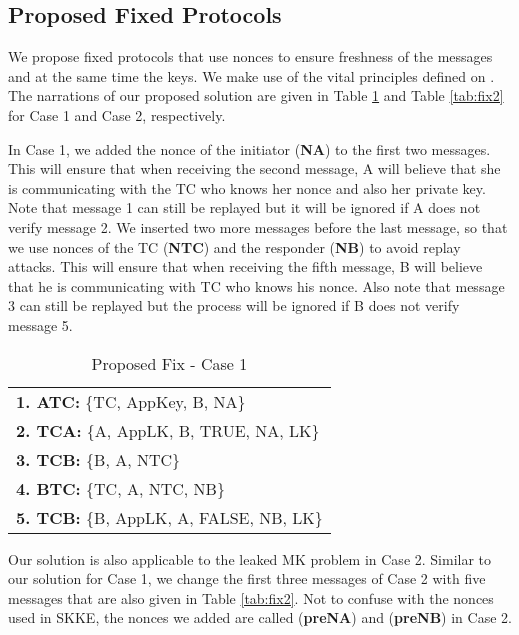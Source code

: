 \subsection{Proposed Fixed Protocols}
\label{fix}
We propose fixed protocols that use nonces to ensure freshness of the messages and at the same time the keys. 
We make use of the vital principles defined on \cite{Abadi:Needham}. 
The narrations of our proposed solution are given in Table \ref{tab:fix1} and Table \ref{tab:fix2} for Case 1 and Case 2, respectively.

In Case 1, we added the nonce of the initiator (\textbf{NA}) to the first two messages. 
This will ensure that when receiving the second message, A will believe that she is communicating with the TC who knows her nonce and also her private key. 
Note that message 1 can still be replayed but it will be ignored if A does not verify message 2. 
We inserted two more messages before the last message, so that we use nonces of the TC (\textbf{NTC}) and the responder (\textbf{NB}) to avoid replay attacks.
This will ensure that when receiving the fifth message, B will believe that he is communicating with TC who knows his nonce.
Also note that message 3 can still be replayed but the process will be ignored if B does not verify message 5. 

\begin{table}\caption{Proposed Fix - Case 1}
\label{tab:fix1}
\centering
\begin{tabular}{l}
\hline
\textbf{1. ATC:} \{TC, AppKey, B, NA\}   \\
\textbf{2. TCA:} \{A, AppLK, B, TRUE, NA, LK\}  \\
\textbf{3. TCB:} \{B, A, NTC\}  \\
\textbf{4. BTC:} \{TC, A, NTC, NB\}  \\
\textbf{5. TCB:} \{B, AppLK, A, FALSE, NB, LK\}  \\
\hline
\end{tabular}
\end{table}
Our solution is also applicable to the leaked MK problem in Case 2. 
Similar to our solution for Case 1, we change the first three messages of Case 2 with five messages that are also given in Table \ref{tab:fix2}.
Not to confuse with the nonces used in SKKE, the nonces we added are called (\textbf{preNA}) and (\textbf{preNB}) in Case 2.

